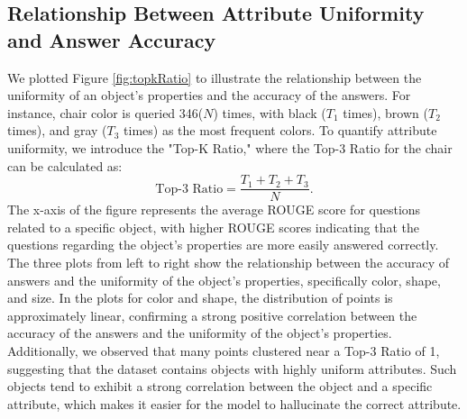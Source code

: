 \subsection{Relationship Between Attribute Uniformity and Answer Accuracy}
We plotted Figure \ref{fig:topkRatio} to illustrate the relationship between the uniformity of an object's properties and the accuracy of the answers. For instance, chair color is queried 346($N$) times, with black ($T_1$ times), brown ($T_2$ times), and gray ($T_3$ times) as the most frequent colors. To quantify attribute uniformity, we introduce the "Top-K Ratio," where the Top-3 Ratio for the chair can be calculated as: 
\begin{equation}
\text{Top-3 Ratio} = \frac{T_1 + T_2 + T_3}{N}.
\end{equation} The x-axis of the figure represents the average ROUGE score for questions related to a specific object, with higher ROUGE scores indicating that the questions regarding the object's properties are more easily answered correctly. The three plots from left to right show the relationship between the accuracy of answers and the uniformity of the object's properties, specifically color, shape, and size.
In the plots for color and shape, the distribution of points is approximately linear, confirming a strong positive correlation between the accuracy of the answers and the uniformity of the object's properties. Additionally, we observed that many points clustered near a Top-3 Ratio of 1, suggesting that the dataset contains objects with highly uniform attributes. Such objects tend to exhibit a strong correlation between the object and a specific attribute, which makes it easier for the model to hallucinate the correct attribute. 
